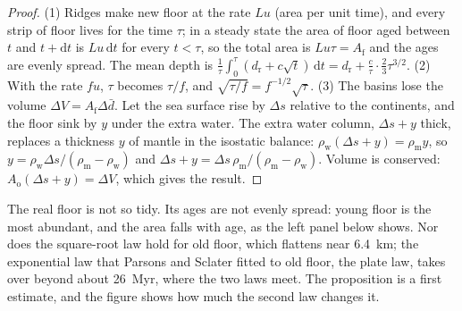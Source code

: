 \begin{proof}
(1) Ridges make new floor at the rate $Lu$ (area per unit time), and every strip of floor lives
for the time $\tau$; in a steady state the area of floor aged between $t$ and $t + \mathrm{d}t$
is $Lu\,\mathrm{d}t$ for every $t < \tau$, so the total area is $Lu\tau = A_{\text{f}}$ and the
ages are evenly spread. The mean depth is
$\frac1\tau\int_0^\tau (d_{\text{r}} + c\sqrt t)\,\mathrm{d}t = d_{\text{r}} + \frac{c}{\tau}
\cdot\frac23\tau^{3/2}$. (2) With the rate $fu$, $\tau$ becomes $\tau/f$, and
$\sqrt{\tau/f} = f^{-1/2}\sqrt\tau$. (3) The basins lose the volume $\Delta V = A_{\text{f}}
\Delta\bar d$. Let the sea surface rise by $\Delta s$ relative to the continents, and the floor
sink by $y$ under the extra water. The extra water column, $\Delta s + y$ thick, replaces a
thickness $y$ of mantle in the isostatic balance: $\rho_{\text{w}}(\Delta s + y) =
\rho_{\text{m}} y$, so $y = \rho_{\text{w}}\Delta s/(\rho_{\text{m}} - \rho_{\text{w}})$ and
$\Delta s + y = \Delta s\,\rho_{\text{m}}/(\rho_{\text{m}} - \rho_{\text{w}})$. Volume is
conserved: $A_{\text{o}}(\Delta s + y) = \Delta V$, which gives the result.
\end{proof}

The real floor is not so tidy. Its ages are not evenly spread: young floor is the most abundant,
and the area falls with age, as the left panel below shows. Nor does the square-root law hold for
old floor, which flattens near \qty{6.4}{km}; the exponential law that Parsons and Sclater
fitted to old floor, the plate law, takes over beyond about \qty{26}{Myr}, where the two laws
meet. The proposition is a first estimate, and the figure
shows how much the second law changes it.

